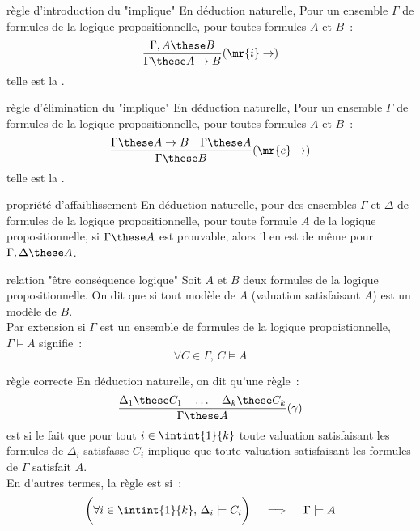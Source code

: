 \begin{definition}{7.14}{règle d'introduction du "implique"}
    En déduction naturelle, Pour un ensemble $\Gamma$ de formules de la logique propositionnelle, pour toutes formules $A$ et $B$~:
    $$\frac{\Gamma,A \these B}{\Gamma \these A \to B}(\mr{i}\to)$$
    telle est la .
\end{definition}

\begin{definition}{7.15}{règle d'élimination du "implique"}
    En déduction naturelle, Pour un ensemble $\Gamma$ de formules de la logique propositionnelle, pour toutes formules $A$ et $B$~:
    $$\frac{\Gamma \these A \to B \quad \Gamma \these A}{\Gamma \these B}(\mr{e}\to)$$
    telle est la .
\end{definition}

\begin{theoreme}{7.16}{propriété d'affaiblissement}
    En déduction naturelle, pour des ensembles $\Gamma$ et $\Delta$ de formules de la logique propositionnelle, pour toute formule $A$ de la logique propositionnelle, si $\Gamma \these A$ est prouvable, alors il en est de même pour $\Gamma,\Delta \these A$.
\end{theoreme}

\begin{definition}{7.17}{relation "être conséquence logique"}
    Soit $A$ et $B$ deux formules de la logique propositionnelle. On dit que  si tout modèle de $A$ (valuation satisfaisant $A$) est un modèle de $B$.\\
    Par extension si $\Gamma$ est un ensemble de formules de la logique propoistionnelle, $\Gamma \models A$ signifie~:
    $$\forall C \in \Gamma,\, C \models A$$ 
\end{definition}

\begin{definition}{7.18}{règle correcte}
    En déduction naturelle, on dit qu'une règle~:
    $$\frac{\Delta_1 \these C_1 \quad \dots \quad \Delta_k \these C_k}{\Gamma \these A}(\gamma)$$
    est  si le fait que pour tout $i \in \intint{1}{k}$ toute valuation satisfaisant les formules de $\Delta_i$ satisfasse $C_i$ implique que toute valuation satisfaisant les formules de $\Gamma$ satisfait $A$.\\
    En d'autres termes, la règle est  si~:
    $$\bigg(\forall i \in \intint{1}{k},\, \Delta_i \models C_i\bigg) \quad\implies \quad \Gamma \models A$$
\end{definition}

